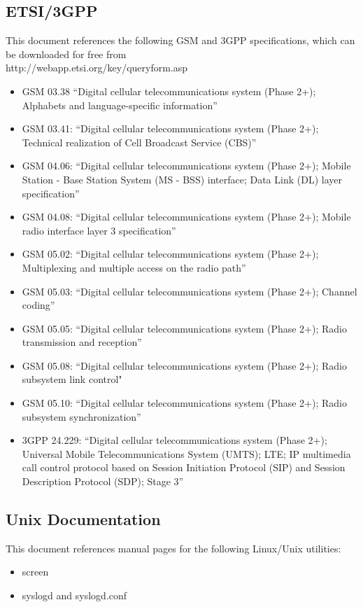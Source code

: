 \documentclass[11pt,openany]{book}
\begin{document}
\subsection{ETSI/3GPP}
This document references the following GSM and 3GPP specifications, which can be downloaded for free from \\

http://webapp.etsi.org/key/queryform.asp \\

\begin{itemize}
	\item GSM 03.38 ``Digital cellular telecommunications system (Phase 2+); Alphabets and language-specific information''
	\item GSM 03.41: ``Digital cellular telecommunications system (Phase 2+); Technical realization of Cell Broadcast Service (CBS)''
	\item GSM 04.06: ``Digital cellular telecommunications system (Phase 2+);  Mobile Station - Base Station System (MS - BSS) interface;  Data Link (DL) layer specification''
	\item GSM 04.08: ``Digital cellular telecommunications system (Phase 2+); Mobile radio interface layer 3 specification''
	\item GSM 05.02: ``Digital cellular telecommunications system (Phase 2+);  Multiplexing and multiple access on the radio path''
	\item GSM 05.03: ``Digital cellular telecommunications system (Phase 2+);  Channel coding''
	\item GSM 05.05: ``Digital cellular telecommunications system (Phase 2+); Radio transmission and reception''
	\item GSM 05.08: ``Digital cellular telecommunications system (Phase 2+); Radio subsystem link control"
	\item GSM 05.10: ``Digital cellular telecommunications system (Phase 2+); Radio subsystem synchronization''
	\item 3GPP 24.229: ``Digital cellular telecommunications system (Phase 2+); Universal Mobile Telecommunications System (UMTS); LTE; IP multimedia call control protocol based on Session Initiation Protocol (SIP) and Session Description Protocol (SDP); Stage 3''
\end{itemize}

\subsection{Unix Documentation}
This document references manual pages for the following Linux/Unix utilities:
\begin{itemize}
	\item screen
	\item syslogd and syslogd.conf
\end{itemize}
\end{document}
